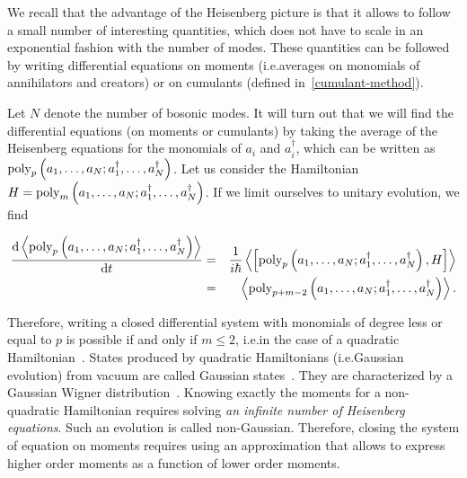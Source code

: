 We recall that the advantage of the Heisenberg picture is that it allows to follow a small number of interesting quantities, which does not have to scale in an exponential fashion with the number of modes. These quantities can be followed by writing differential equations on moments (i.e.\@ averages on monomials of annihilators and creators) or on cumulants (defined in~\autoref{cumulant-method}).

Let $N$ denote the number of  bosonic modes. It will turn out that we will find the differential equations (on moments or cumulants) by taking the average of the Heisenberg equations for the monomials of $a_i$ and $a^\dagger_i$, which can be written as $\text{poly}_{p}\left(a_1, \ldots, a_N; a^\dagger_1, \ldots, a^\dagger_N\right)$. Let us consider the Hamiltonian $H = \text{poly}_{m}\left(a_1, \ldots, a_N; a^\dagger_1, \ldots, a^\dagger_N\right)$. If we limit ourselves to unitary evolution, we find

\begin{eqnarray}
    \timeDeriv{\average{\poly{p}{a_1, \ldots, a_N; a^\dagger_1, \ldots, a^\dagger_N}}} &=& \ihbar \average{\commutator{\poly{p}{a_1, \ldots, a_N; a^\dagger_1, \ldots, a^\dagger_N}}{H}} \nonumber\\
    &=& \average{\poly{p + m - 2}{a_1, \ldots, a_N; a^\dagger_1, \ldots, a^\dagger_N}}.
\end{eqnarray}

Therefore, writing a closed differential system with monomials of degree less or equal to $p$ is possible if and only if $m \le 2$, i.e.\@ in the case of a quadratic Hamiltonian~\cite{elie-these, Dudas2023-xx}. States produced by quadratic Hamiltonians (i.e.\@ Gaussian evolution) from vacuum are called Gaussian states~\cite{elie-these, quesada-fast-sum-Gauss}. They are characterized by a Gaussian Wigner distribution~\cite{explo_quant, quesada-fast-sum-Gauss, walls_milburn}. Knowing exactly the moments for a non-quadratic Hamiltonian requires solving \textit{an infinite number of Heisenberg equations}. Such an evolution is called non-Gaussian. Therefore, closing the system of equation on moments requires using an approximation that allows to express higher order moments as a function of lower order moments.

